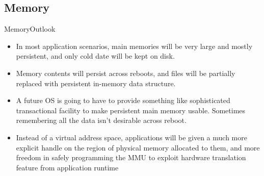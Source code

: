 \documentclass[10pt]{beamer}
\begin{document}
\subsection{Memory}
\begin{frame}{Memory}{Outlook}
  \begin{itemize}
    \item In most application scenarios, main memories will be very large and
          mostly persistent, and only cold date will be kept on disk.
    \item Memory contents will persist across reboots, and files will be
          partially replaced with persistent in-memory data structure.
    \item A future OS is going to have to provide something like sophisticated
          transactional facility to make persistent main memory usable.
          Sometimes remembering all the data isn't desirable across reboot.
    \item Instead of a virtual address space, applications will be given a much
          more explicit handle on the region of physical memory allocated to
          them, and more freedom in safely programming the MMU to exploit
          hardware translation feature from application runtime
  \end{itemize}
\end{frame}

{\1
\begin{frame}
\end{frame}}
\end{document}
